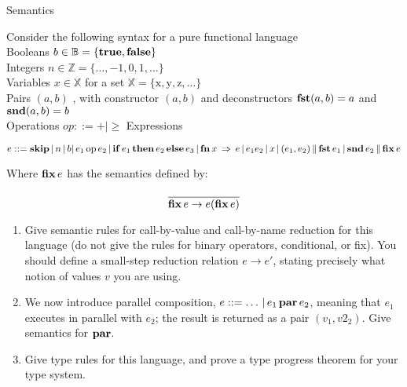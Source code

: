 \documentclass{tripos}  %
\begin{document}
\begin{question}[MockIB,year=2024,paper=2,question=7,author=rrw]{Semantics}


  Consider the following syntax for a pure functional language\\

  Booleans $b \in \mathbb{B} = \{ \mbox{\textbf{true}}, \mbox{\textbf{false}} \}$ \\
  Integers $n \in \mathbb{Z} = \{ \dots{}, -1, 0, 1, \dots{} \}$\\
  Variables $x \in \mathbb{X}$ for a set $\mathbb{X} = \{ \mbox{x}, \mbox{y}, \mbox{z}, \dots{} \}$ \\
  Pairs $(a,b)$ , with constructor $(a,b)$ and deconstructors $\mbox{\textbf{fst}} (a,b) = a$ and $\mbox{\textbf{snd}} (a,b) = b$ \\
  Operations $ op ::= + | \ge$
  Expressions

  \[
  e ::= \mbox{\textbf{skip}}\, |\, n\, |\, b |\, e_1\, \mbox{op}\, e_2 \,|\, \mbox{\textbf{if}}\, e_1\, \mbox{\textbf{then}}\, e_2\, \mbox{\textbf{else}}\, e_3\, |\, \mbox{\textbf{fn}}\, x\, \Rightarrow\, e \,|\, e_1 e_2\, |\, x \,|\, (e_1,e_2) \,\|\, \mbox{\textbf{fst}}\, e_1 \,|\, \mbox{\textbf{snd}}\, e_2\, \| \,\mbox{\textbf{fix}}\, e
  \]

  Where $\mbox{\textbf{fix}}\, e$ has the semantics defined by:

  \[
  \frac{}{\mbox{\textbf{fix}}\, e \rightarrow e(\mbox{\textbf{fix}}\, e)}
  \]

  \begin{enumerate}
  \item Give semantic rules for call-by-value and call-by-name reduction for this language (do not give the rules for binary operators, conditional, or fix). You should define a small-step reduction relation $e \rightarrow e'$, stating precisely what notion of values $v$ you are using. 
  \item We now introduce parallel composition, $ e ::= \dots{}\, |\, e_1\, \mbox{\textbf{par}}\, e_2 $, meaning that $e_1$ executes in parallel with $e_2$; the result is returned as a pair $(v_1, v2_2)$. Give semantics for $\mbox{\textbf{par}}$.
  \item Give type rules for this language, and prove a type progress theorem for your type system. 
    \end{enumerate}

\end{question}
\end{document}
